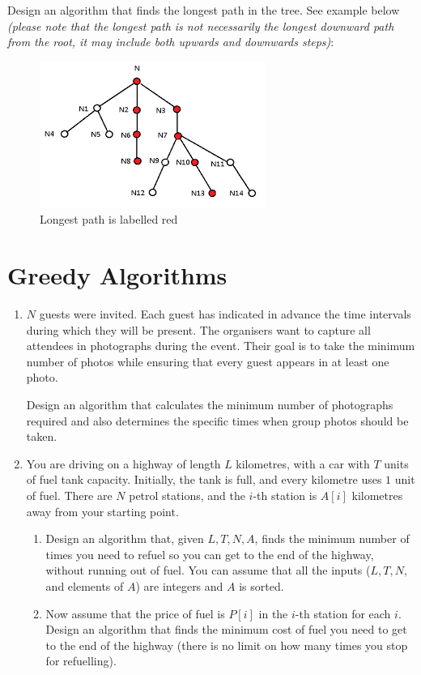 \documentclass{article}
\begin{document}
\begin{enumerate}
    Design an algorithm that finds the longest path in the tree. See example below\\ \emph{(please note that the longest path is not necessarily the longest downward path from the root, it may include both upwards and downwards steps)}:
    \begin{figure}[h]
        \centering
        \includegraphics[width=0.32\linewidth]{longest-path.png}
        \caption{Longest path is labelled red}
        \label{fig:enter-label}
    \end{figure}
\end{enumerate}

\section{Greedy Algorithms}

\begin{enumerate}
    \item $N$ guests were invited. Each guest has indicated in advance the time intervals during which they will be present. The organisers want to capture all attendees in photographs during the event. Their goal is to take the minimum number of photos while ensuring that every guest appears in at least one photo.

    Design an algorithm that calculates the minimum number of photographs required and also determines the specific times when group photos should be taken.
    \item You are driving on a highway of length $L$ kilometres, with a car with  $T$ units of fuel tank capacity. Initially, the tank is full, and every kilometre uses $1$ unit of fuel. There are $N$ petrol stations, and the $i$-th station is $A[i]$ kilometres away from your starting point.
    \begin{enumerate} 
        \item Design an algorithm that, given $L, T, N, A$, finds the minimum number of times you need to refuel so you can get to the end of the highway, without running out of fuel. You can assume that all the inputs ($L,T, N,$ and elements of $A$) are integers and $A$ is sorted.
        \item Now assume that the price of fuel is $P[i]$ in the $i$-th station for each $i$. Design an algorithm that finds the minimum cost of fuel you need to get to the end of the highway (there is no limit on how many times you stop for refuelling).
    \end{enumerate}
\end{enumerate}
\end{document}
